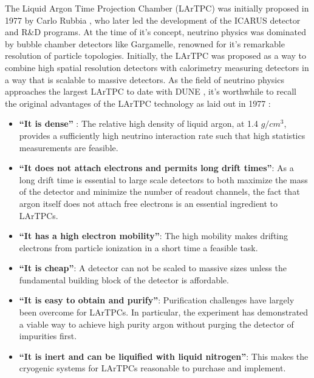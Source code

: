The Liquid Argon Time Projection Chamber (LArTPC) was initially proposed in 1977 by Carlo Rubbia \cite{Rubbia:1977zz}, who later led the development of the ICARUS detector and R\&D programs.  At the time of it's concept, neutrino physics was dominated by bubble chamber detectors like Gargamelle, renowned for it's remarkable resolution of particle topologies.  Initially, the LArTPC was proposed as a way to combine high spatial resolution detectors with calorimetry measuring detectors in a way that is scalable to massive detectors.  As the field of neutrino physics approaches the largest LArTPC to date with DUNE \cite{DUNE}, it's worthwhile to recall the original advantages of the LArTPC technology as laid out in 1977 \cite{Rubbia:1977zz}:

\begin{itemize}

\item{\bf ``It is dense''} : The relative high density of liquid argon, at 1.4 $g/cm^3$, provides a sufficiently high neutrino interaction rate such that high statistics measurements are feasible.

\item{\bf ``It does not attach electrons and permits long drift times''}: As a long drift time is essential to large scale detectors to both maximize the mass of the detector and minimize the number of readout channels, the fact that argon itself does not attach free electrons is an essential ingredient to LArTPCs.

\item{\bf ``It has a high electron mobility''}: The high mobility makes drifting electrons from particle ionization in a short time a feasible task.

\item{\bf ``It is cheap''}:  A detector can not be scaled to massive sizes unless the fundamental building block of the detector is affordable.

\item{\bf ``It is easy to obtain and purify''}: Purification challenges have largely been overcome for LArTPCs.  In particular, the \uboone experiment has demonstrated a viable way to achieve high purity argon without purging the detector of impurities first.

\item{\bf ``It is inert and can be liquified with liquid nitrogen''}: This makes the cryogenic systems for LArTPCs reasonable to purchase and implement.

\end{itemize}


